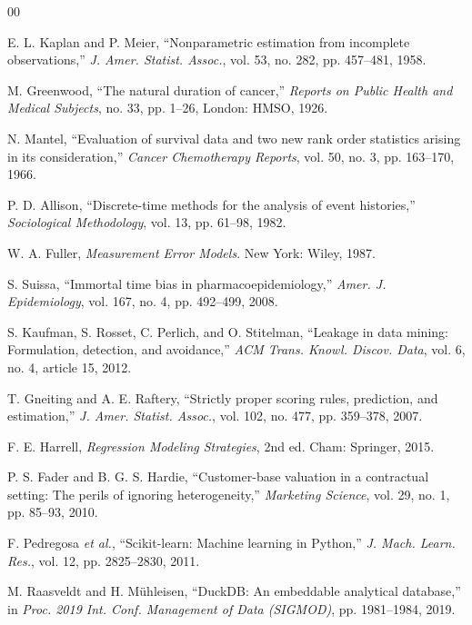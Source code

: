 \documentclass[conference]{IEEEtran}
\begin{document}
\begin{thebibliography}{00}

 E. L. Kaplan and P. Meier, ``Nonparametric estimation from
incomplete observations,'' \emph{J. Amer. Statist. Assoc.}, vol. 53, no. 282,
pp. 457--481, 1958.

 M. Greenwood, ``The natural duration of cancer,''
\emph{Reports on Public Health and Medical Subjects}, no. 33, pp. 1--26, London:
HMSO, 1926.

 N. Mantel, ``Evaluation of survival data and two new rank
order statistics arising in its consideration,'' \emph{Cancer Chemotherapy
Reports}, vol. 50, no. 3, pp. 163--170, 1966.

 P. D. Allison, ``Discrete-time methods for the analysis of
event histories,'' \emph{Sociological Methodology}, vol. 13, pp. 61--98, 1982.

 W. A. Fuller, \emph{Measurement Error Models}. New York:
Wiley, 1987.

 S. Suissa, ``Immortal time bias in pharmacoepidemiology,''
\emph{Amer. J. Epidemiology}, vol. 167, no. 4, pp. 492--499, 2008.

 S. Kaufman, S. Rosset, C. Perlich, and O. Stitelman,
``Leakage in data mining: Formulation, detection, and avoidance,'' \emph{ACM
Trans. Knowl. Discov. Data}, vol. 6, no. 4, article 15, 2012.

 T. Gneiting and A. E. Raftery, ``Strictly proper scoring
rules, prediction, and estimation,'' \emph{J. Amer. Statist. Assoc.}, vol. 102,
no. 477, pp. 359--378, 2007.

 F. E. Harrell, \emph{Regression Modeling Strategies},
2nd ed. Cham: Springer, 2015.

 P. S. Fader and B. G. S. Hardie, ``Customer-base valuation
in a contractual setting: The perils of ignoring heterogeneity,'' \emph{Marketing
Science}, vol. 29, no. 1, pp. 85--93, 2010.

 F. Pedregosa \emph{et al.}, ``Scikit-learn: Machine
learning in Python,'' \emph{J. Mach. Learn. Res.}, vol. 12, pp. 2825--2830, 2011.

 M. Raasveldt and H. M\"uhleisen, ``DuckDB: An embeddable
analytical database,'' in \emph{Proc. 2019 Int. Conf. Management of Data
(SIGMOD)}, pp. 1981--1984, 2019.

\end{thebibliography}
\end{document}
